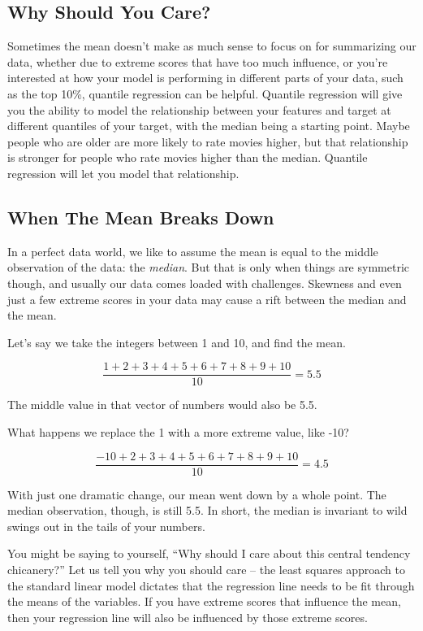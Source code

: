 \documentclass[
  letterpaper,
]{krantz}
\begin{document}
\subsection{Why Should You Care?}\label{sec-quantile-why}

Sometimes the mean doesn't make as much sense to focus on for
summarizing our data, whether due to extreme scores that have too much
influence, or you're interested at how your model is performing in
different parts of your data, such as the top 10\%, quantile regression
can be helpful. Quantile regression will give you the ability to model
the relationship between your features and target at different quantiles
of your target, with the median being a starting point. Maybe people who
are older are more likely to rate movies higher, but that relationship
is stronger for people who rate movies higher than the median. Quantile
regression will let you model that relationship.

\subsection{When The Mean Breaks Down}\label{sec-quantile-break}

In a perfect data world, we like to assume the mean is equal to the
middle observation of the data: the \emph{median}. But that is only when
things are symmetric though, and usually our data comes loaded with
challenges. Skewness and even just a few extreme scores in your data may
cause a rift between the median and the mean.

Let's say we take the integers between 1 and 10, and find the mean.

\[\frac{1+2+3+4+5+6+7+8+9+10}{10} =  5.5\]

The middle value in that vector of numbers would also be 5.5.

What happens we replace the 1 with a more extreme value, like -10?

\[\frac{-10+2+3+4+5+6+7+8+9+10}{10} =  4.5\]

With just one dramatic change, our mean went down by a whole point. The
median observation, though, is still 5.5. In short, the median is
invariant to wild swings out in the tails of your numbers.

You might be saying to yourself, ``Why should I care about this central
tendency chicanery?'' Let us tell you why you should care -- the least
squares approach to the standard linear model dictates that the
regression line needs to be fit through the means of the variables. If
you have extreme scores that influence the mean, then your regression
line will also be influenced by those extreme scores.
\end{document}
